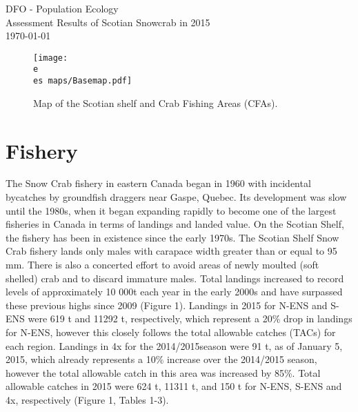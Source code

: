 \documentclass[paper=a4, fontsize=11pt]{article}
\newcommand{\e}{/home/michelle/ecomod_data/}
\newcommand{\es}{snowcrab/}
\begin{document}
  \begin{titlepage}
  \vspace*{\fill}
  \begin{center}
    {DFO - Population Ecology}\\[0.5cm]
    {Assessment Results of Scotian Snowcrab in 2015}\\[0.4cm]
    {\normalsize\today}
\begin{figure} [h]
\centering
  \texttt{[image: \\e \\es maps/Basemap.pdf]}
  \caption{Map of the Scotian shelf and Crab Fishing Areas (CFAs).}
 \end{figure}
 \end{center}
\vspace*{\fill}
\end{titlepage}


\section{Fishery}
The Snow Crab fishery in eastern Canada began in 1960 with incidental bycatches by groundfish draggers near Gaspe, Quebec. Its development was slow until the 1980s, when it began expanding rapidly to become one of the largest fisheries in Canada in terms of landings and landed value. On the Scotian Shelf, the fishery has been in existence since the early 1970s. The Scotian Shelf Snow Crab fishery lands only males with carapace width greater than or equal to 95 mm. There is also a concerted effort to avoid areas of newly moulted (soft shelled) crab and to discard immature males. Total landings increased to record levels of approximately 10 000t each year in the early 2000s and have surpassed these previous highs since 2009 (Figure 1). Landings in 2015 for N-ENS and S-ENS were 619 t and 11292 t, respectively, which represent a 20\% drop in landings for N-ENS, however this closely follows the total allowable catches (TACs) for each region. Landings in 4x for the 2014/2015season were 91 t, as of January 5, 2015, which already represents a 10\% increase over the 2014/2015 season, however the total allowable catch in this area was increased by 85\%. Total allowable catches in 2015 were 624 t, 11311 t, and 150 t for N-ENS, S-ENS and 4x, respectively (Figure 1, Tables 1-3). \\
\end{document}
